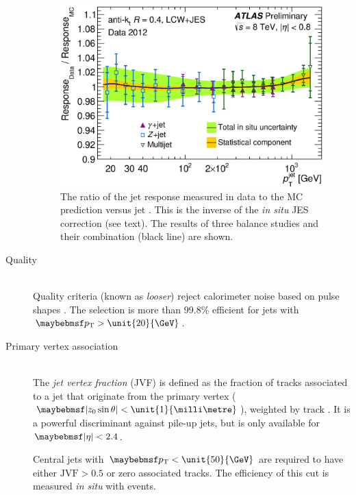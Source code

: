 \begin{description}
	\begin{figure}
		\includegraphics[width=\mediumfigwidth]{tex/selection/jet_insitu_corr}
		\caption{The ratio of the jet response measured in data to the MC prediction 
		versus jet \pt. This is the inverse of the \textit{in situ} JES correction (see 
		text). The results of three \pt balance studies and their combination (black line)
		are shown.}
		\label{fig:objects:jet_insitu}
	\end{figure}

\item[Quality] \hfill \\
	Quality criteria (known as \textit{looser}) reject calorimeter noise based on 
	pulse shapes \cite{Jets:Quality:2011}. The selection is more than 99.8\% efficient 
	for jets with $\pt > \unit{20}{\GeV}$.

\item[Primary vertex association] \hfill \\
	The \textit{jet vertex fraction} (JVF) is defined as the fraction of tracks 
	associated to a jet that originate from the primary vertex ($\mods{z_0 \sin\theta} < 
	\unit{1}{\milli\metre}$), weighted by track \pt \cite{Jets:PileupCorrection:2012}. 
	It is a powerful discriminant against pile-up jets, but is only available for 
	$\mods{\eta} < 2.4$.

	Central jets with $\pt < \unit{50}{\GeV}$ are required to have either 
	$\text{JVF} > 0.5$ or zero associated tracks. The efficiency of this cut is measured 
	\textit{in situ} with \Zjets events.

\end{description}



